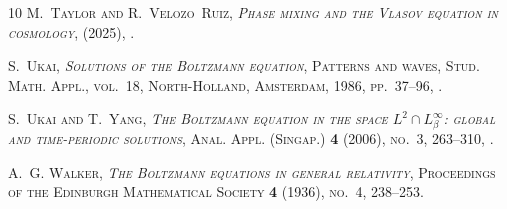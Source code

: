 \documentclass[reqno]{amsart}
\theoremstyle{definition}
\numberwithin{equation}{section}
\numberwithin{theorem}{section}
\begin{document}
\begin{thebibliography}{10}
\bgroup\scshape{}M.~Taylor\egroup{} and \bgroup\scshape{}R.~Velozo~Ruiz\egroup{}, \emph{{Phase mixing and the Vlasov equation in cosmology}},  (2025), .

\bgroup\scshape{}S.~Ukai\egroup{}, \emph{Solutions of the {B}oltzmann equation}, Patterns and waves, Stud. Math. Appl., vol.~18, North-Holland, Amsterdam, 1986, pp.~37--96, .

\bgroup\scshape{}S.~Ukai\egroup{} and \bgroup\scshape{}T.~Yang\egroup{}, \emph{The {B}oltzmann equation in the space {$L^2\cap L^\infty_\beta$}: global and time-periodic solutions}, Anal. Appl. (Singap.) \textbf{4} (2006), no.~3, 263--310, .

\bgroup\scshape{}A.~G. Walker\egroup{}, \emph{{The Boltzmann equations in general relativity}}, Proceedings of the Edinburgh Mathematical Society \textbf{4} (1936), no.~4, 238--253.

\end{thebibliography}
\end{document}
